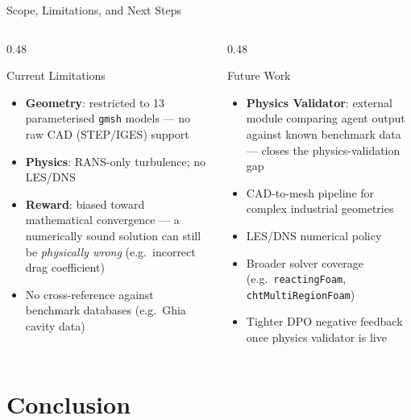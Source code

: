 \documentclass[aspectratio=169,10pt]{beamer}
\begin{document}
\begin{frame}{Scope, Limitations, and Next Steps}
  \begin{columns}
    \begin{column}{0.48\textwidth}
      \begin{alertblock}{Current Limitations}
        \begin{itemize}
          \item \textbf{Geometry}: restricted to 13 parameterised \texttt{gmsh} models — no raw CAD (STEP/IGES) support
          \item \textbf{Physics}: RANS-only turbulence; no LES/DNS
          \item \textbf{Reward}: biased toward mathematical convergence — a numerically sound solution can still be \textit{physically wrong} (e.g.\ incorrect drag coefficient)
          \item No cross-reference against benchmark databases (e.g.\ Ghia cavity data)
        \end{itemize}
      \end{alertblock}
    \end{column}
    \begin{column}{0.48\textwidth}
      \begin{exampleblock}{Future Work}
        \begin{itemize}
          \item \textbf{Physics Validator}: external module comparing agent output against known benchmark data — closes the physics-validation gap
          \item CAD-to-mesh pipeline for complex industrial geometries
          \item LES/DNS numerical policy
          \item Broader solver coverage (e.g.\ \texttt{reactingFoam}, \texttt{chtMultiRegionFoam})
          \item Tighter DPO negative feedback once physics validator is live
        \end{itemize}
      \end{exampleblock}
    \end{column}
  \end{columns}
\end{frame}

\section{Conclusion}
\end{document}
